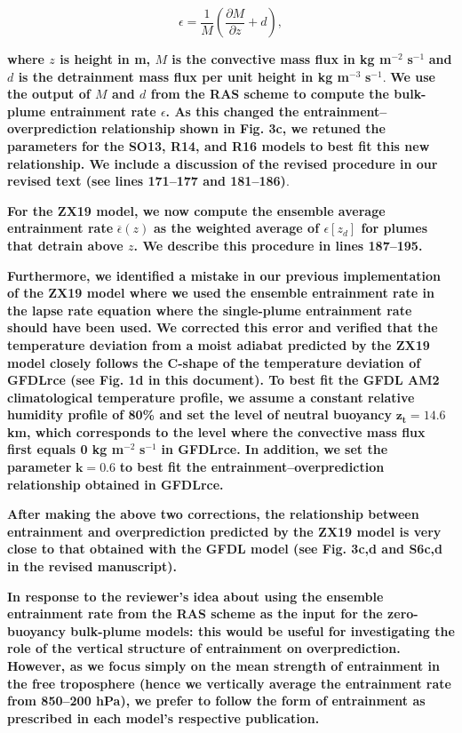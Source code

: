 \documentclass[11pt]{article}
\begin{document}
\begin{equation}
\epsilon = \frac{1}{M}\left(\frac{\partial M}{\partial z}+d\right),
\end{equation}

\textbf{where \(z\) is height in m, \(M\) is the convective mass flux in kg m}\(^{-2}\) \textbf{s}\(^{-1}\) \textbf{and \(d\) is the detrainment mass flux per unit height in kg m}\(^{-3}\) \textbf{s}\(^{-1}\). \textbf{We use the output of \(M\) and \(d\) from the RAS scheme to compute the bulk-plume entrainment rate \(\epsilon\). As this changed the entrainment--overprediction relationship shown in Fig. 3c, we retuned the parameters for the SO13, R14, and R16 models to best fit this new relationship. We include a discussion of the revised procedure in our revised text (see lines 171--177 and 181--186)}.

\textbf{For the ZX19 model, we now compute the ensemble average entrainment rate} \(\overline{\epsilon}(z)\) \textbf{as the weighted average of \(\epsilon[z_d]\) for plumes that detrain above \(z\). We describe this procedure in lines 187--195.}

\textbf{Furthermore, we identified a mistake in our previous implementation of the ZX19 model where we used the ensemble entrainment rate in the lapse rate equation where the single-plume entrainment rate should have been used. We corrected this error and verified that the temperature deviation from a moist adiabat predicted by the ZX19 model closely follows the C-shape of the temperature deviation of GFDLrce (see Fig. 1d in this document). To best fit the GFDL AM2 climatological temperature profile, we assume a constant relative humidity profile of 80\% and set the level of neutral buoyancy} \(\mathbf{z_t=14.6}\) \textbf{km, which corresponds to the level where the convective mass flux first equals 0 kg m}\(^{-2}\) \textbf{s}\(^{-1}\) \textbf{in GFDLrce. In addition, we set the parameter} \(\mathbf{k=0.6}\) \textbf{to best fit the entrainment--overprediction relationship obtained in GFDLrce.}

\textbf{After making the above two corrections, the relationship between entrainment and overprediction predicted by the ZX19 model is very close to that obtained with the GFDL model (see Fig. 3c,d and S6c,d in the revised manuscript).}

\textbf{In response to the reviewer's idea about using the ensemble entrainment rate from the RAS scheme as the input for the zero-buoyancy bulk-plume models: this would be useful for  investigating the role of the vertical structure of entrainment on overprediction. However, as we focus simply on the mean strength of entrainment in the free troposphere (hence we vertically average the entrainment rate from 850--200 hPa), we prefer to follow the form of entrainment as prescribed in each model's respective publication.}
\end{document}
